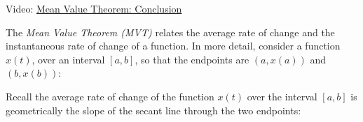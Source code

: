 \documentclass[pdftex, brazil, 12pt, twoside]{article}
\begin{document}
Video: \href{https://www.youtube.com/watch?v=8yMIILYAxkw}{Mean Value Theorem: Conclusion}

The \emph{Mean Value Theorem (MVT)} relates the average rate of change
and the instantaneous rate of change of a function.
In more detail, consider a function
$x(t)$, over an interval $[a, b]$, so that the endpoints are
$(a, x(a))$ and $(b, x(b))$:

\begin{figure}[H]
  \begin{center}
    \label{fig:mvt-avgxinst-5}
  \end{center}
\end{figure}

Recall the average rate of change of the function
$x(t)$ over the interval $[a, b]$ is geometrically
the slope of the secant line through the two endpoints:

\begin{figure}[H]
  \begin{center}
    \label{fig:mvt-avgxinst-6}
  \end{center}
\end{figure}
\end{document}
